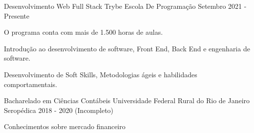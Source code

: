 

\begin{cventries}

\cventry
    {Desenvolvimento Web Full Stack} %
    {Trybe} %
    {Escola De Programação} %
    {Setembro 2021 - Presente} %
    {
      \begin{cvitems} %
        \item {O programa conta com mais de 1.500 horas de aulas.}
      \item {Introdução ao desenvolvimento de software, Front End, Back End e engenharia de software.}
      \item {Desenvolvimento de Soft Skills, Metodologias ágeis e habilidades comportamentais.}
      \end{cvitems}
    }
   
   \cventry
    {Bacharelado em Ciências Contábeis} %
    {Universidade Federal Rural do Rio de Janeiro} %
    {Seropédica} %
    {2018 - 2020 (Incompleto)} %
    {
      \begin{cvitems} %
        \item{Conhecimentos sobre mercado financeiro}
      \end{cvitems}
    } 

\end{cventries}
